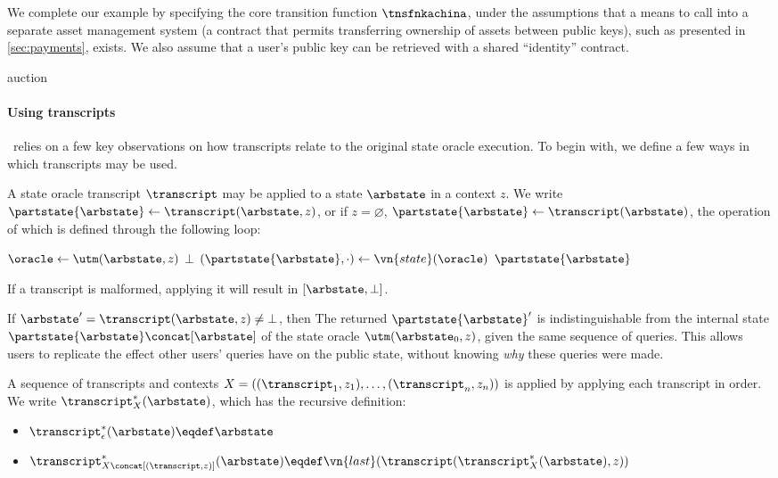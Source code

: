 We complete our example by specifying the core transition function $\tnsfnkachina$,
under the assumptions that a means to call into a separate asset management
system (a contract that permits transferring ownership of assets between public
keys), such as presented in \iffull\autoref{sec:payments}\else\cite[Appendix~J.4]{fullversion}\fi, exists. We also assume that
a user's public key can be retrieved with a shared ``identity'' contract.

{auction}


\paragraph{Using transcripts}
\kachina\ relies on a few key observations on how transcripts relate to the
original state oracle execution. To begin with, we define a few ways in which
transcripts may be used.
\begin{definition}
  A state oracle transcript $\transcript$ may be applied to a state $\arbstate$
  in a context $z$. We write $\partstate{\arbstate} \gets \transcript(\arbstate, z)$, or if
  $z = \varnothing$, $\partstate{\arbstate} \gets \transcript(\arbstate)$, the operation of
  which is defined through the following loop:
  \begin{algorithmic}
      \State \Let $\oracle \gets \utm(\arbstate, z)$
        \State {}
          \Return $\bot$
        \EndIf
      \EndFor
      \State \Let $(\partstate{\arbstate}, \cdot) \gets \vn{state}(\oracle)$
      \State \Return $\partstate{\arbstate}$
    \EndFunction
  \end{algorithmic}
  If a transcript is malformed, applying it will result in $[\arbstate,
    \bot]$.
\end{definition}

If $\arbstate' = \transcript(\arbstate, z) \neq \bot$, then 
The returned $\partstate{\arbstate}'$ is indistinguishable from the internal state
$\partstate{\arbstate} \concat [\arbstate]$ of the state oracle $\utm(\arbstate_0,
z)$, given the same sequence of queries. This allows users to replicate the
effect other users' queries have on the public state, without knowing \emph{why}
these queries were made.

\begin{definition}
  A sequence of transcripts and contexts $X = ((\transcript_1, z_1), \ldots,
  (\transcript_n, z_n))$ is applied by applying each transcript in order. We write
  $\transcript^*_X(\arbstate)$, which has the recursive definition:
  \begin{itemize}
    \item $\transcript^*_\epsilon(\arbstate) \eqdef \arbstate$
    \item $\transcript^*_{X \concat [(\transcript, z)]}(\arbstate) \eqdef
      \vn{last}(\transcript(\transcript^*_X(\arbstate), z))$
  \end{itemize}
\end{definition}

